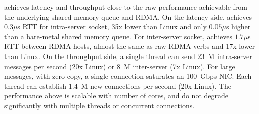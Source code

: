 
\sys{} achieves latency and throughput close to the raw performance achievable from the underlying shared memory queue and RDMA.
On the latency side, \sys{} achieves $0.3\mu$s RTT for intra-server socket, 35x lower than Linux and only $0.05\mu$s higher than a bare-metal shared memory queue. For inter-server socket, \sys{} achieves $1.7\mu$s RTT between RDMA hosts, almost the same as raw RDMA verbs and 17x lower than Linux.
On the throughput side, a single thread can send 23~M intra-server messages per second (20x Linux) or 8~M inter-server (7x Linux). For large messages, with zero copy, a single connection saturates an 100~Gbps NIC. Each thread can establish 1.4~M new connections per second (20x Linux). The performance above is scalable with number of cores, and do not degrade significantly with multiple threads or concurrent connections.



\iffalse
This paper makes the following contributions:
\begin{ecompact}
	\item A Linux compatible, secure and high performance user-space socket system that supports both inter-process, inter-container and inter-host communication.
	\item A per-host monitor daemon for trusted control plane and peer-to-peer queues for scalable data plane.
	\item A multi-sender and multi-receiver lockless queue to fully support fork and multi-thread socket sharing.
	\item A memory efficient message queue that multiplexes multiple sockets and allows fetching from any socket, while using shared memory and RDMA transports efficiently.
\end{ecompact}
\fi
